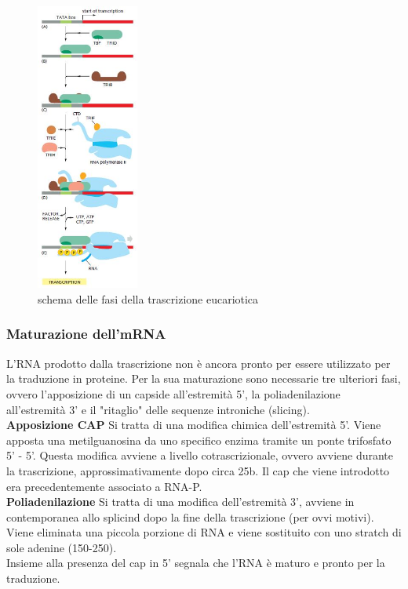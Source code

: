         \begin{figure}[h]
            \centering
            \includegraphics[width=0.3\textwidth]{images/trascrizioneEuka.JPG}
            \caption{\small schema delle fasi della trascrizione eucariotica}
            \label{fig:mesh1}
        \end{figure}
        
        \subsubsection{Maturazione dell'mRNA}
        L'RNA prodotto dalla trascrizione non è ancora pronto per essere utilizzato per la traduzione in proteine. Per la sua maturazione sono necessarie tre ulteriori fasi, ovvero l'apposizione di un capside all'estremità 5', la poliadenilazione all'estremità 3' e il "ritaglio" delle sequenze introniche (slicing). \\
            
            \textbf{Apposizione CAP}
            Si tratta di una modifica chimica dell'estremità 5'. Viene apposta una metilguanosina da uno specifico enzima tramite un ponte trifosfato 5' - 5'. 
            Questa modifica avviene a livello cotrascrizionale, ovvero avviene durante la trascrizione, approssimativamente dopo circa 25b. Il cap che viene introdotto era precedentemente associato a RNA-P.\\
            
            \textbf{Poliadenilazione}
            Si tratta di una modifica dell'estremità 3', avviene in contemporanea allo splicind dopo la fine della trascrizione (per ovvi motivi). Viene eliminata una piccola porzione di RNA e viene sostituito con uno stratch di sole adenine (150-250).\\
            Insieme alla presenza del cap in 5' segnala che l'RNA è maturo e pronto per la traduzione.
            
